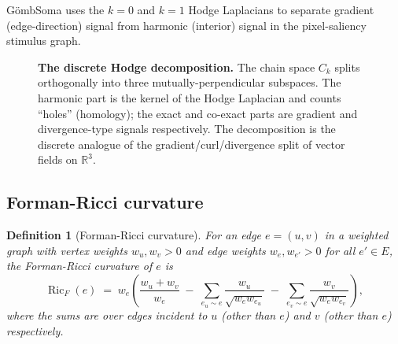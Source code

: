 \documentclass[11pt,a4paper]{article}
\newtheorem{definition}[theorem]{Definition}
\theoremstyle{remark}
\DeclareMathOperator{\im}{im}
\DeclareMathOperator{\Ric}{Ric}
\newcommand{\R}{\mathbb{R}}
\newcommand{\GS}{G\"omb}
\begin{document}
\GS{}Soma uses the $k = 0$ and $k = 1$ Hodge Laplacians to
separate gradient (edge-direction) signal from harmonic
(interior) signal in the pixel-saliency stimulus graph.

\begin{figure}[h]
\centering
{}
\caption{\textbf{The discrete Hodge decomposition.} The chain
space $C_k$ splits orthogonally into three mutually-perpendicular
subspaces. The harmonic part is the kernel of the Hodge
Laplacian and counts ``holes'' (homology); the exact and co-exact
parts are gradient and divergence-type signals respectively. The
decomposition is the discrete analogue of the
gradient/curl/divergence split of vector fields on $\R^3$.}
\label{fig:hodge-decomposition}
\end{figure}

\subsection{Forman-Ricci curvature}

\begin{definition}[Forman-Ricci curvature]
For an edge $e = (u, v)$ in a weighted graph with vertex weights
$w_u, w_v > 0$ and edge weights $w_e, w_{e'} > 0$ for all $e' \in
E$, the \emph{Forman-Ricci curvature} of $e$ is
\[
  \Ric_F(e) \;=\;
    w_e \!\left( \frac{w_u + w_v}{w_e}
    \;-\; \sum_{e_u \sim e} \frac{w_u}{\sqrt{w_e w_{e_u}}}
    \;-\; \sum_{e_v \sim e} \frac{w_v}{\sqrt{w_e w_{e_v}}}
    \right),
\]
where the sums are over edges incident to $u$ (other than $e$)
and $v$ (other than $e$) respectively.
\end{definition}
\end{document}
